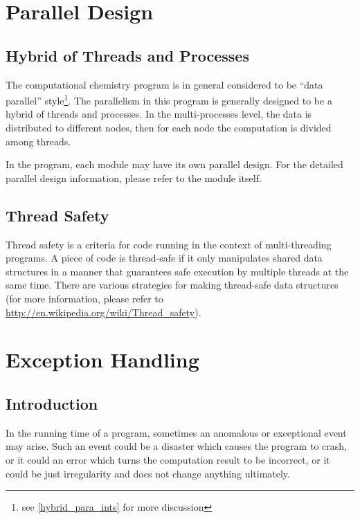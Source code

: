 \section{Parallel Design}
%
%
%

\subsection{Hybrid of Threads and Processes}
%
%
%
The computational chemistry program is in general considered to be ``data parallel'' 
style\footnote{see \ref{hybrid_para_ints} for more discussion}. The parallelism in
this program is generally designed to be a hybrid of threads and processes. In
the multi-processes level, the data is distributed to different nodes, then for each
node the computation is divided among threads. 

In the program, each module may have its own parallel design. For the detailed
parallel design information, please refer to the module itself.

\subsection{Thread Safety}
%
%
%
Thread safety is a criteria for code running in the context of multi-threading programs. 
A piece of code is thread-safe if it only manipulates shared data structures in a manner 
that guarantees safe execution by multiple threads at the same time. There are various 
strategies for making thread-safe data structures (for more information, please refer
to \url{http://en.wikipedia.org/wiki/Thread_safety}).


\section{Exception Handling}
\label{exception_handling}
%
%
%
\subsection{Introduction}
%
%
%
In the running time of a program, sometimes an anomalous or exceptional event may
arise. Such an event could be a disaster which causes the program to crash, 
or it could an error which turns the computation result to be incorrect, 
or it could be just irregularity and does not change anything ultimately.  

